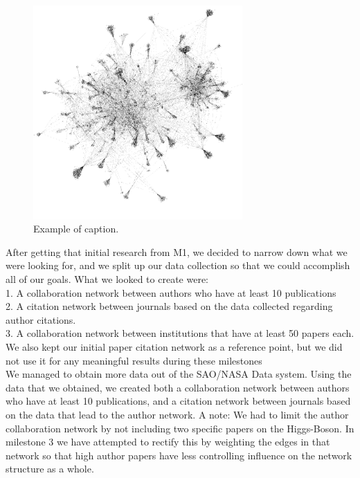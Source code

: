 \documentclass[times, 10pt,twocolumn]{article}
\begin{document}
\begin{figure}[h]
   \includegraphics[width=8cm]{figure1.png}
   \caption{Example of caption.}
\end{figure}

After getting that initial research from M1, we decided to narrow down what we were looking for, and we split up our data collection so that we could accomplish all of our goals. What we looked to create were: \\
1. A collaboration network between authors who have at least 10 publications \\
2. A citation network between journals based on the data collected regarding author citations.\\
3. A collaboration network between institutions that have at least 50 papers each.\\

We also kept our initial paper citation network as a reference point, but we did not use it for any meaningful results during these milestones \\

We managed to obtain more data out of the SAO/NASA Data system. Using the data that we obtained, we created both a collaboration network between authors who have at least 10 publications, and a citation network between journals based on the data that lead to the author network. A note: We had to limit the author collaboration network by not including two specific papers on the Higgs-Boson. In milestone 3 we have attempted to rectify this by weighting the edges in that network so that high author papers have less controlling influence on the network structure as a whole. \\
\end{document}
